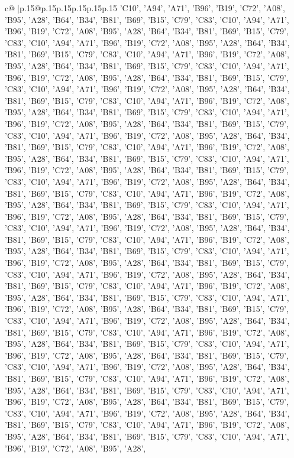 \documentclass{article}
\begin{document}
{\begin{supertabular}{c@{$\;$}|p{.15\linewidth}@{}p{.15\linewidth}p{.15\linewidth}p{.15\linewidth}p{.15\linewidth}p{.15\linewidth}}
{{{'C10', 'A94', 'A71', 'B96', 'B19', 'C72', 'A08', 'B95', 'A28', 'B64', 'B34', 'B81', 'B69', 'B15', 'C79', 'C83', 'C10', 'A94', 'A71', 'B96', 'B19', 'C72', 'A08', 'B95', 'A28', 'B64', 'B34', 'B81', 'B69', 'B15', 'C79', 'C83', 'C10', 'A94', 'A71', 'B96', 'B19', 'C72', 'A08', 'B95', 'A28', 'B64', 'B34', 'B81', 'B69', 'B15', 'C79', 'C83', 'C10', 'A94', 'A71', 'B96', 'B19', 'C72', 'A08', 'B95', 'A28', 'B64', 'B34', 'B81', 'B69', 'B15', 'C79', 'C83', 'C10', 'A94', 'A71', 'B96', 'B19', 'C72', 'A08', 'B95', 'A28', 'B64', 'B34', 'B81', 'B69', 'B15', 'C79', 'C83', 'C10', 'A94', 'A71', 'B96', 'B19', 'C72', 'A08', 'B95', 'A28', 'B64', 'B34', 'B81', 'B69', 'B15', 'C79', 'C83', 'C10', 'A94', 'A71', 'B96', 'B19', 'C72', 'A08', 'B95', 'A28', 'B64', 'B34', 'B81', 'B69', 'B15', 'C79', 'C83', 'C10', 'A94', 'A71', 'B96', 'B19', 'C72', 'A08', 'B95', 'A28', 'B64', 'B34', 'B81', 'B69', 'B15', 'C79', 'C83', 'C10', 'A94', 'A71', 'B96', 'B19', 'C72', 'A08', 'B95', 'A28', 'B64', 'B34', 'B81', 'B69', 'B15', 'C79', 'C83', 'C10', 'A94', 'A71', 'B96', 'B19', 'C72', 'A08', 'B95', 'A28', 'B64', 'B34', 'B81', 'B69', 'B15', 'C79', 'C83', 'C10', 'A94', 'A71', 'B96', 'B19', 'C72', 'A08', 'B95', 'A28', 'B64', 'B34', 'B81', 'B69', 'B15', 'C79', 'C83', 'C10', 'A94', 'A71', 'B96', 'B19', 'C72', 'A08', 'B95', 'A28', 'B64', 'B34', 'B81', 'B69', 'B15', 'C79', 'C83', 'C10', 'A94', 'A71', 'B96', 'B19', 'C72', 'A08', 'B95', 'A28', 'B64', 'B34', 'B81', 'B69', 'B15', 'C79', 'C83', 'C10', 'A94', 'A71', 'B96', 'B19', 'C72', 'A08', 'B95', 'A28', 'B64', 'B34', 'B81', 'B69', 'B15', 'C79', 'C83', 'C10', 'A94', 'A71', 'B96', 'B19', 'C72', 'A08', 'B95', 'A28', 'B64', 'B34', 'B81', 'B69', 'B15', 'C79', 'C83', 'C10', 'A94', 'A71', 'B96', 'B19', 'C72', 'A08', 'B95', 'A28', 'B64', 'B34', 'B81', 'B69', 'B15', 'C79', 'C83', 'C10', 'A94', 'A71', 'B96', 'B19', 'C72', 'A08', 'B95', 'A28', 'B64', 'B34', 'B81', 'B69', 'B15', 'C79', 'C83', 'C10', 'A94', 'A71', 'B96', 'B19', 'C72', 'A08', 'B95', 'A28', 'B64', 'B34', 'B81', 'B69', 'B15', 'C79', 'C83', 'C10', 'A94', 'A71', 'B96', 'B19', 'C72', 'A08', 'B95', 'A28', 'B64', 'B34', 'B81', 'B69', 'B15', 'C79', 'C83', 'C10', 'A94', 'A71', 'B96', 'B19', 'C72', 'A08', 'B95', 'A28', 'B64', 'B34', 'B81', 'B69', 'B15', 'C79', 'C83', 'C10', 'A94', 'A71', 'B96', 'B19', 'C72', 'A08', 'B95', 'A28', 'B64', 'B34', 'B81', 'B69', 'B15', 'C79', 'C83', 'C10', 'A94', 'A71', 'B96', 'B19', 'C72', 'A08', 'B95', 'A28', 'B64', 'B34', 'B81', 'B69', 'B15', 'C79', 'C83', 'C10', 'A94', 'A71', 'B96', 'B19', 'C72', 'A08', 'B95', 'A28', 'B64', 'B34', 'B81', 'B69', 'B15', 'C79', 'C83', 'C10', 'A94', 'A71', 'B96', 'B19', 'C72', 'A08', 'B95', 'A28', 'B64', 'B34', 'B81', 'B69', 'B15', 'C79', 'C83', 'C10', 'A94', 'A71', 'B96', 'B19', 'C72', 'A08', 'B95', 'A28', 'B64', 'B34', 'B81', 'B69', 'B15', 'C79', 'C83', 'C10', 'A94', 'A71', 'B96', 'B19', 'C72', 'A08', 'B95', 'A28', 'B64', 'B34', 'B81', 'B69', 'B15', 'C79', 'C83', 'C10', 'A94', 'A71', 'B96', 'B19', 'C72', 'A08', 'B95', 'A28', 'B64', 'B34', 'B81', 'B69', 'B15', 'C79', 'C83', 'C10', 'A94', 'A71', 'B96', 'B19', 'C72', 'A08', 'B95', 'A28', 'B64', 'B34', 'B81', 'B69', 'B15', 'C79', 'C83', 'C10', 'A94', 'A71', 'B96', 'B19', 'C72', 'A08', 'B95', 'A28', }}}
\end{supertabular}}
\end{document}
